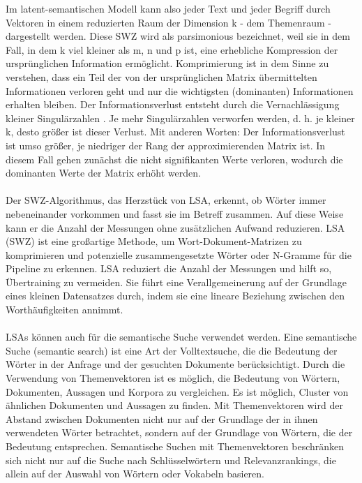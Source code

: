 \noindent
Im latent-semantischen Modell kann also jeder Text und jeder Begriff durch Vektoren in einem reduzierten Raum der Dimension k - dem Themenraum - dargestellt werden. 
Diese \ac{SWZ} wird als parsimonious bezeichnet, weil sie in dem Fall, in dem k viel kleiner als m, n und p ist, eine erhebliche Kompression der ursprünglichen Information ermöglicht. 
Komprimierung ist in dem Sinne zu verstehen, dass ein Teil der von der ursprünglichen Matrix übermittelten Informationen verloren geht und nur die wichtigsten (dominanten) Informationen erhalten bleiben. 
Der Informationsverlust entsteht durch die Vernachlässigung kleiner Singulärzahlen \cite{deerwester_indexing_1990}.
Je mehr Singulärzahlen verworfen werden, d. h. je kleiner k, desto größer ist dieser Verlust. 
Mit anderen Worten: Der Informationsverlust ist umso größer, je niedriger der Rang der approximierenden Matrix ist. 
In diesem Fall gehen zunächst die nicht signifikanten Werte verloren, wodurch die dominanten Werte der Matrix erhöht werden. \cite{lane_natural_2019}\\\\
Der \ac{SWZ}-Algorithmus, das Herzstück von \ac{LSA}, erkennt, ob Wörter immer nebeneinander vorkommen und fasst sie im Betreff zusammen. 
Auf diese Weise kann er die Anzahl der Messungen ohne zusätzlichen Aufwand reduzieren. 
\ac{LSA} (\ac{SWZ}) ist eine großartige Methode, um Wort-Dokument-Matrizen zu komprimieren und potenzielle zusammengesetzte Wörter oder N-Gramme für die Pipeline zu erkennen. 
\ac{LSA} reduziert die Anzahl der Messungen und hilft so, Übertraining zu vermeiden. 
Sie führt eine Verallgemeinerung auf der Grundlage eines kleinen Datensatzes durch, indem sie eine lineare Beziehung zwischen den Worthäufigkeiten annimmt. \cite{jurafsky_speech_2009}\\\\
\ac{LSA}s können auch für die semantische Suche verwendet werden. 
Eine semantische Suche (semantic search) ist eine Art der Volltextsuche, die die Bedeutung der Wörter in der Anfrage und der gesuchten Dokumente berücksichtigt. 
Durch die Verwendung von Themenvektoren ist es möglich, die Bedeutung von Wörtern, Dokumenten, Aussagen und Korpora zu vergleichen. 
Es ist möglich, Cluster von ähnlichen Dokumenten und Aussagen zu finden. 
Mit Themenvektoren wird der Abstand zwischen Dokumenten nicht nur auf der Grundlage der in ihnen verwendeten Wörter betrachtet, sondern auf der Grundlage von Wörtern, die der Bedeutung entsprechen. 
Semantische Suchen mit Themenvektoren beschränken sich nicht nur auf die Suche nach Schlüsselwörtern und Relevanzrankings, die allein auf der Auswahl von Wörtern oder Vokabeln basieren. 
